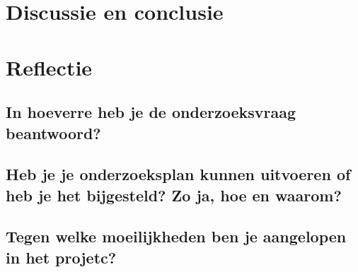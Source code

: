 \documentclass{article}
\begin{document}
\section{Discussie en conclusie}
\section{Reflectie}
\subsection{In hoeverre heb je de onderzoeksvraag beantwoord?}
\subsection{Heb je je onderzoeksplan kunnen uitvoeren of heb je het bijgesteld? Zo ja, hoe en waarom?}
\subsection{Tegen welke moeilijkheden ben je aangelopen in het projetc?}
\end{document}
